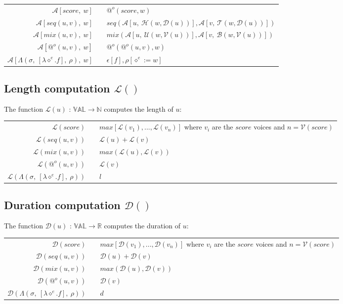 \documentclass[10pt,a4paper,frenchb]{article}
\makeatletter
\newcommand{\var}[1]	{\ensuremath{\diamond^#1}}
\newcommand{\val}		{\ensuremath{\mathbb{VAL}}}
\newcommand{\closure}	{\ensuremath{\Lambda}}
\newcommand{\applyop}	{\ensuremath{@}}
\newcommand{\noredex}	{\ensuremath{\applyop^o}}
\newcommand{\evalsym}			{\ensuremath{\epsilon}}
\newcommand{\envsym}			{\ensuremath{\rho}}
\newcommand{\applysym}		{\ensuremath{\mathcal A}}
\newcommand{\closenv}[2][f]		{\closure(#2,\ [\lambda \var{e}.#1],\ \envsym)}
\newcommand{\evalsimple}[1]			{\evalsym\left[#1\right],\rho}
\newcommand{\applysimple}	[2]			{\applysym\left[#1,\ #2\right]}
\newcommand{\apexpr}[1] 	{#1(u, v)}
\newcommand{\length}		{\ensuremath{\mathcal L}}
\newcommand{\voices}		{\ensuremath{\mathcal V}}
\newcommand{\dur}			{\ensuremath{\mathcal D}}
\newcommand{\head}			{\ensuremath{\mathcal H}}
\newcommand{\tail}			{\ensuremath{\mathcal T}}
\renewcommand{\top}		{\ensuremath{\mathcal U}}
\newcommand{\bottom}		{\ensuremath{\mathcal B}}
\newcommand{\bounds}		{\ensuremath{\sigma}}
\newcommand{\evaltable}[1][$\rightarrow$]	  {\begin{center} \begin{tabular*}{0.9\linewidth}{rc@{ #1 }l}}
\newcommand{\evaltablend}  		{\end{tabular*}\end{center}}
\makeatother
\begin{document}
\evaltable
 \hline
 $\applysimple{score}{w}$				& & $\noredex(score,w)$ \\
 $\applysimple{\apexpr{seq}}{w}$		& & $seq(\applysimple{u}{\head(w,\dur(u))}, \applysimple{v}{\tail(w,\dur(u))})$ \\
 $\applysimple{\apexpr{mix}}{w}$ 	& & $mix(\applysimple{u}{\top(w,\voices(u))}, \applysimple{v}{\bottom(w,\voices(u))})$ \\
 $\applysimple{\noredex (u,v)}{w}$ 	& & $\noredex(\noredex(u,v),w)$ \\
 $\applysimple{\closenv{\bounds}}{w}$ & & $\evalsimple{f}[\var{e} := w]$ \\
 \hline
\evaltablend


\subsection{Length computation $\length()$}
The function $\length(u)$ : $\val \rightarrow \mathbb{N}$ computes the length of $u$:

\evaltable
 \hline
 $\length(score)$				& & $max[\length(v_1),...,\length(v_n)]$ where $v_i$ are the $score$ voices and $n=\voices(score)$ \\
 $\length(\apexpr{seq})$		& & $\length(u) + \length(v)$ \\
 $\length(\apexpr{mix})$ 			& & $max(\length(u), \length(v))$ \\
 $\length(\noredex (u,v))$ 	& & $\length(v)$ \\
 $\length(\closenv{\bounds})$ 	& & $l$ \\
 \hline
\evaltablend

\subsection{Duration computation $\dur()$}
The function $\dur(u)$ : $\val \rightarrow \mathbb{R}$ computes the duration of $u$:

\evaltable
 \hline
 $\dur(score)$				& & $max[\dur(v_1),..., \dur(v_n)]$ where $v_i$ are the $score$ voices and $n=\voices(score)$\\
 $\dur(\apexpr{seq})$		& & $\dur(u) + \dur(v)$ \\
 $\dur(\apexpr{mix})$ 	& & $max(\dur(u), \dur(v))$ \\
 $\dur(\noredex (u,v))$ 	& & $\dur(v)$ \\
 $\dur(\closenv{\bounds})$ 	& & $d$ \\
 \hline
\evaltablend
\end{document}
